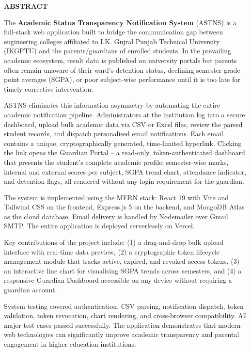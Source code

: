 \documentclass[12pt,a4paper]{report}
\begin{document}
\newpage
\begin{center}{\fontsize{16pt}{18pt}\selectfont\textbf{ABSTRACT}}\end{center}
\noindent
The \textbf{Academic Status Transparency Notification System} (ASTNS) is a full-stack web application built to bridge the communication gap between engineering colleges affiliated to I.K. Gujral Punjab Technical University (IKGPTU) and the parents/guardians of enrolled students. In the prevailing academic ecosystem, result data is published on university portals but parents often remain unaware of their ward's detention status, declining semester grade point averages (SGPA), or poor subject-wise performance until it is too late for timely corrective intervention.

ASTNS eliminates this information asymmetry by automating the entire academic notification pipeline. Administrators at the institution log into a secure dashboard, upload bulk academic data via CSV or Excel files, review the parsed student records, and dispatch personalised email notifications. Each email contains a unique, cryptographically generated, time-limited hyperlink. Clicking the link opens the Guardian Portal -- a read-only, token-authenticated dashboard that presents the student's complete academic profile: semester-wise marks, internal and external scores per subject, SGPA trend chart, attendance indicator, and detention flags, all rendered without any login requirement for the guardian.

The system is implemented using the MERN stack: React 19 with Vite and Tailwind CSS on the frontend, Express.js 5 on the backend, and MongoDB Atlas as the cloud database. Email delivery is handled by Nodemailer over Gmail SMTP. The entire application is deployed serverlessly on Vercel.

Key contributions of the project include: (1) a drag-and-drop bulk upload interface with real-time data preview, (2) a cryptographic token lifecycle management module that tracks active, expired, and revoked access tokens, (3) an interactive line chart for visualising SGPA trends across semesters, and (4) a responsive Guardian Dashboard accessible on any device without requiring a guardian account.

System testing covered authentication, CSV parsing, notification dispatch, token validation, token revocation, chart rendering, and cross-browser compatibility. All major test cases passed successfully. The application demonstrates that modern web technologies can significantly improve academic transparency and parental engagement in higher education institutions.
\end{document}
